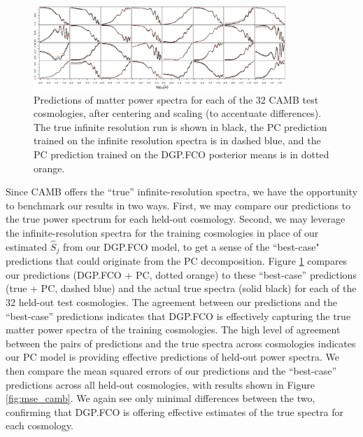 \documentclass[11pt]{article}
\begin{document}
\begin{figure}
    \centering
    \includegraphics[width=0.85\textwidth]{pred_diffs_CAMB.jpeg}
    \caption{Predictions of matter power spectra for each of the 32 CAMB test cosmologies,
             after centering and scaling (to accentuate differences). 
             The true infinite resolution run is shown in black, the PC prediction 
             trained on the infinite resolution spectra is in dashed blue, and the PC prediction trained
             on the DGP.FCO posterior means is in dotted orange.}
    \label{fig:pca_preds_v_camb}
\end{figure}

Since CAMB offers the ``true'' infinite-resolution spectra, we have the opportunity to benchmark our
results in two ways.  First, we may compare our predictions to the true power spectrum for each held-out
cosmology.  Second, we may leverage the infinite-resolution spectra for the training cosmologies in
place of our estimated $\hat{S}_j$ from our DGP.FCO model, to get a sense of the ``best-case" predictions 
that could originate from the PC decomposition.  
Figure \ref{fig:pca_preds_v_camb} compares our predictions (DGP.FCO + PC, dotted orange)
to these ``best-case'' predictions (true + PC, dashed blue) and the actual true spectra (solid black)
for each of the 32 held-out test cosmologies.  
The agreement between our predictions and the ``best-case'' predictions indicates that DGP.FCO is effectively
capturing the true matter power spectra of the training cosmologies.
The high level of agreement between the pairs of predictions and the true spectra across cosmologies
indicates our PC model is providing effective predictions of held-out power spectra.
We then compare the mean squared errors of our predictions and the ``best-case'' 
predictions across all held-out cosmologies, with results shown in Figure \ref{fig:mse_camb}.  We again
see only minimal differences between the two, confirming that DGP.FCO is offering effective
estimates of the true spectra for each cosmology.
\end{document}
